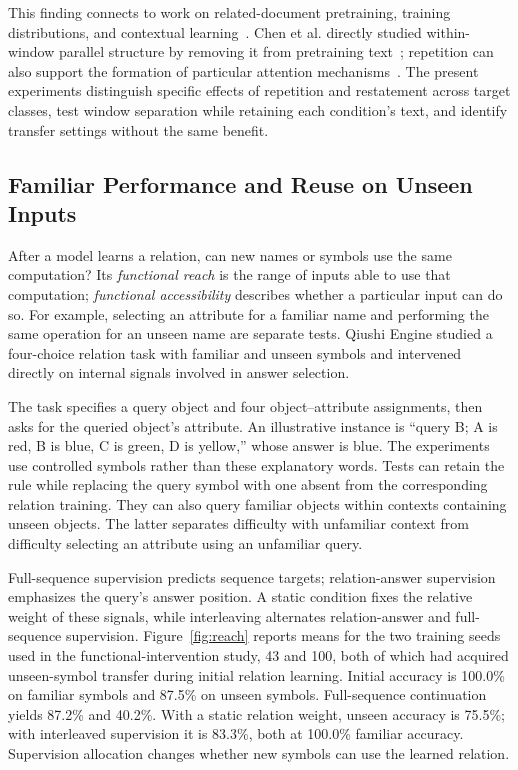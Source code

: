 This finding connects to work on related-document pretraining, training distributions, and contextual learning~\citep{shi2024incontext,chan2022distribution,haga2024variationsets}. Chen et al. directly studied within-window parallel structure by removing it from pretraining text~\citep{chen2024parallel}; repetition can also support the formation of particular attention mechanisms~\citep{zucchet2025sparse}. The present experiments distinguish specific effects of repetition and restatement across target classes, test window separation while retaining each condition's text, and identify transfer settings without the same benefit.

\subsection{Familiar Performance and Reuse on Unseen Inputs}
\label{sec:reach}

After a model learns a relation, can new names or symbols use the same computation? Its \emph{functional reach} is the range of inputs able to use that computation; \emph{functional accessibility} describes whether a particular input can do so. For example, selecting an attribute for a familiar name and performing the same operation for an unseen name are separate tests. Qiushi Engine studied a four-choice relation task with familiar and unseen symbols and intervened directly on internal signals involved in answer selection.

The task specifies a query object and four object--attribute assignments, then asks for the queried object's attribute. An illustrative instance is ``query B; A is red, B is blue, C is green, D is yellow,'' whose answer is blue. The experiments use controlled symbols rather than these explanatory words. Tests can retain the rule while replacing the query symbol with one absent from the corresponding relation training. They can also query familiar objects within contexts containing unseen objects. The latter separates difficulty with unfamiliar context from difficulty selecting an attribute using an unfamiliar query.

Full-sequence supervision predicts sequence targets; relation-answer supervision emphasizes the query's answer position. A static condition fixes the relative weight of these signals, while interleaving alternates relation-answer and full-sequence supervision. Figure~\ref{fig:reach} reports means for the two training seeds used in the functional-intervention study, 43 and 100, both of which had acquired unseen-symbol transfer during initial relation learning. Initial accuracy is 100.0\% on familiar symbols and 87.5\% on unseen symbols. Full-sequence continuation yields 87.2\% and 40.2\%. With a static relation weight, unseen accuracy is 75.5\%; with interleaved supervision it is 83.3\%, both at 100.0\% familiar accuracy. Supervision allocation changes whether new symbols can use the learned relation.

